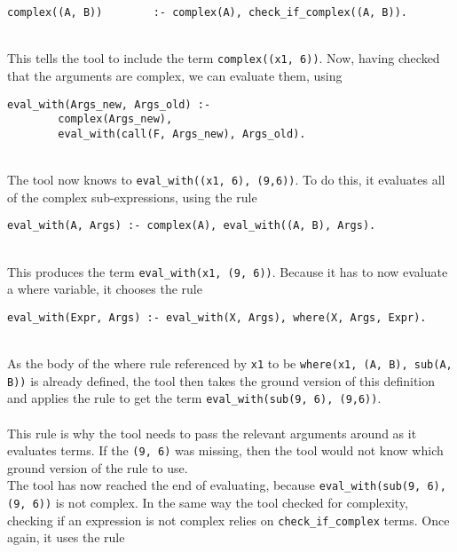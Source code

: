 \begin{lstlisting}[firstnumber=163]
complex((A, B))        :- complex(A), check_if_complex((A, B)).
\end{lstlisting}
\mbox{} \\
This tells the tool to include the term \lstinline!complex((x1, 6))!. Now, having checked that the arguments are complex, we can evaluate them, using \\

\begin{lstlisting}[firstnumber=135]
eval_with(Args_new, Args_old) :- 
		complex(Args_new), 
		eval_with(call(F, Args_new), Args_old).
\end{lstlisting}
\mbox{} \\
The tool now knows to \lstinline!eval_with((x1, 6), (9,6))!. To do this, it evaluates all of the complex sub-expressions, using the rule \\ 

\begin{lstlisting}[firstnumber=139]
eval_with(A, Args) :- complex(A), eval_with((A, B), Args).
\end{lstlisting}
\mbox{} \\
This produces the term \lstinline{eval_with(x1, (9, 6))}. Because it has to now evaluate a where variable, it chooses the rule \\ %

\begin{lstlisting}[firstnumber=133]
eval_with(Expr, Args) :- eval_with(X, Args), where(X, Args, Expr).
\end{lstlisting}
\mbox{} \\
As the body of the where rule referenced by \lstinline{x1} to be \lstinline{where(x1, (A, B), sub(A, B))} is already defined, the tool then takes the ground version of this definition and applies the rule to get the term \lstinline{eval_with(sub(9, 6), (9,6))}. \\ \\%
This rule is why the tool needs to pass the relevant arguments around as it evaluates terms. If the \lstinline{(9, 6)} was missing, then the tool would not know which ground version of the rule to use.\\ %
The tool has now reached the end of evaluating, because \lstinline{eval_with(sub(9, 6), (9, 6))} is not complex. In the same way the tool checked for complexity, checking if an expression is not complex relies on \lstinline{check_if_complex} terms. Once again, it uses the rule\\

